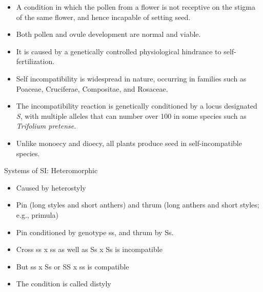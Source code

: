 \documentclass[11pt,ignorenonframetext,aspectratio=169]{beamer}
\providecommand{\tightlist}{%
  \setlength{\itemsep}{0pt}\setlength{\parskip}{0pt}}
\begin{document}
\begin{frame}{}
\protect\hypertarget{section-6}{}
\begin{itemize}
\tightlist
\item
  A condition in which the pollen from a flower is not receptive on the
  stigma of the same flower, and hence incapable of setting seed.
\item
  Both pollen and ovule development are normal and viable.
\item
  It is caused by a genetically controlled physiological hindrance to
  self-fertilization.
\item
  Self incompatibility is widespread in nature, occurring in families
  such as Poaceae, Cruciferae, Compositae, and Rosaceae.
\item
  The incompatibility reaction is genetically conditioned by a locus
  designated \emph{S}, with multiple alleles that can number over 100 in
  some species such as \emph{Trifolium pretense}.
\item
  Unlike monoecy and dioecy, all plants produce seed in
  self-incompatible species.
\end{itemize}
\end{frame}

\begin{frame}{Systems of SI: Heteromorphic}
\protect\hypertarget{systems-of-si-heteromorphic}{}
\begin{itemize}
\tightlist
\item
  Caused by heterostyly
\item
  Pin (long styles and short anthers) and thrum (long anthers and short
  styles; e.g., primula)
\item
  Pin conditioned by genotype ss, and thrum by Ss.
\item
  Cross ss x ss as well as Ss x Ss is incompatible
\item
  But ss x Ss or SS x ss is compatible
\item
  The condition is called distyly
\end{itemize}
\end{frame}
\end{document}
